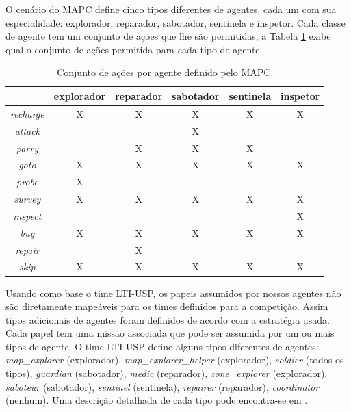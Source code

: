 \documentclass{llncs}
\begin{document}
O cenário do MAPC define cinco tipos diferentes de agentes, cada um com sua especialidade: explorador, reparador, sabotador, sentinela e inspetor. Cada classe de agente tem um conjunto de ações que lhe são permitidas, a Tabela \ref{table:tab1} exibe qual o conjunto de ações permitida para cada tipo de agente.

\begin{table}[h]
\centering
\begin{tabular}{|c|c|c|c|c|c|}
	\hline
	         & explorador & reparador & sabotador & sentinela & inspetor \\ \hline
	\textit{recharge} &      X      &     X      &     X      &    X       & X \\ \hline
  \textit{attack}  &            &           &     X      &           &  \\ \hline
  \textit{parry}   &            &     X      &    X       &    X       &  \\ \hline
  \textit{goto}   &     X       &     X      &   X        &    X       & X  \\ \hline
  \textit{probe}   &     X       &           &           &           &  \\ \hline
  \textit{survey}  &      X      &     X      &    X       &    X       & X \\ \hline
  \textit{inspect}  &            &           &           &           &  X\\ \hline
  \textit{buy}    &     X       &     X      &     X      &   X        & X \\ \hline
  \textit{repair}  &            &      X     &           &           &  \\ \hline
  \textit{skip}   &    X        &     X      &    X       &   X        & X \\ \hline
\end{tabular}
\caption{Conjunto de ações por agente definido pelo MAPC.}
\label{table:tab1}
\end{table}

Usando como base o time LTI-USP, os papeis assumidos por nossos agentes não são diretamente mapeáveis para os times definidos para a competição. Assim tipos adicionais de agentes foram definidos de acordo com a estratégia usada. Cada papel tem uma missão associada que pode ser assumida por um ou mais tipos de agente. O time LTI-USP define alguns tipos diferentes de agentes: \textit{map\_explorer} (explorador), \textit{map\_explorer\_helper} (explorador), \textit{soldier} (todos os tipos), \textit{guardian} (sabotador), \textit{medic} (reparador), \textit{zone\_explorer} (explorador), \textit{saboteur} (sabotador), \textit{sentinel} (sentinela), \textit{repairer} (reparador), \textit{coordinator} (nenhum). Uma descrição detalhada de cada tipo pode encontra-se em \cite{franco2013improving}.
\end{document}
